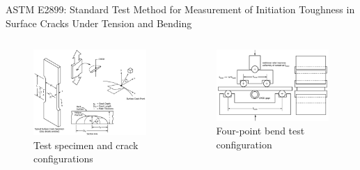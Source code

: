 \begin{frame}
ASTM E2899: Standard Test Method for Measurement of Initiation Toughness in Surface Cracks Under Tension and Bending
\begin{columns}[b]
\begin{column}{0.45\textwidth}
\begin{figure}
\centering
\includegraphics[width=0.9\columnwidth]{sc-terminology-e2899-modified}
\caption{Test specimen and crack configurations}
\end{figure}
\end{column}
\begin{column}{0.45\textwidth}
\begin{figure}
\centering
\includegraphics[width=0.9\columnwidth]{astm-e2899-4point-bend}
\caption{Four-point bend test configuration}
\end{figure}
\end{column}
\end{columns}
\end{frame}


